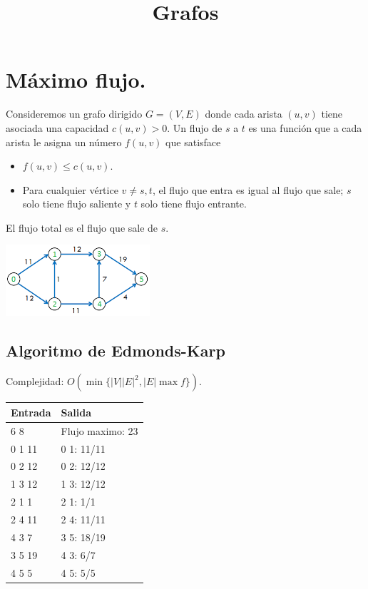 \documentclass[12pt, letterpaper, twoside]{article}
\title{Grafos}
\begin{document}
\section{Máximo flujo.}

Consideremos un grafo dirigido $G = (V, E)$ donde cada arista $(u, v)$ tiene asociada una capacidad $c(u,v) > 0$. Un flujo de $s$ a $t$ es una función que a cada arista le asigna un número $f(u,v)$ que satisface
\begin{itemize}
\item $f(u, v) \leq c(u,v)$.
\item Para cualquier vértice $v \neq s, t$, el flujo que entra es igual al flujo que sale; $s$ solo tiene flujo saliente y $t$ solo tiene flujo entrante.
\end{itemize}
El flujo total es el flujo que sale de $s$.

\begin{center}
\includegraphics[width = 0.4\textwidth]{MaxFlow.png}	
\end{center}

\subsection{Algoritmo de Edmonds-Karp}

Complejidad: $O(\min\{|V||E|^2, |E| \max f\})$.

 

\begin{tabular}{|p{7cm}|p{7cm}|}
\hline
\textbf{Entrada} & \textbf{Salida}\\ \hline
6 8 & Flujo maximo: 23\\
0 1 11 & 0 1: 11/11\\
0 2 12 & 0 2: 12/12\\
1 3 12 & 1 3: 12/12\\
2 1 1  & 2 1: 1/1\\
2 4 11 & 2 4: 11/11\\
4 3 7  & 3 5: 18/19\\
3 5 19 & 4 3: 6/7\\
4 5 5 & 4 5: 5/5\\ \hline
\end{tabular}
\end{document}
